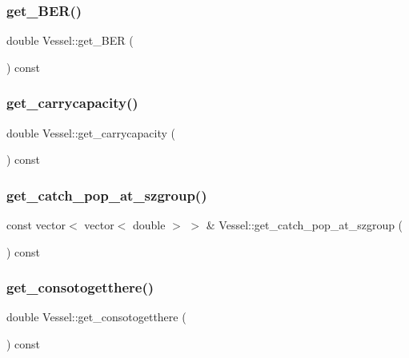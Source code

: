 \mbox{\label{class_vessel_ac8ae65328d4b7f44cf4db93d038dece6}} 
\subsubsection{\texorpdfstring{get\_BER()}{get\_BER()}}
{\footnotesize\ttfamily double Vessel\+::get\+\_\+\+B\+ER (\begin{DoxyParamCaption}{ }\end{DoxyParamCaption}) const}

\mbox{\label{class_vessel_ad842186a93c004b2d31434ff25f82e41}} 
\subsubsection{\texorpdfstring{get\_carrycapacity()}{get\_carrycapacity()}}
{\footnotesize\ttfamily double Vessel\+::get\+\_\+carrycapacity (\begin{DoxyParamCaption}{ }\end{DoxyParamCaption}) const}

\mbox{\label{class_vessel_a98fd681fbbe88e187bb3fea156651308}} 
\subsubsection{\texorpdfstring{get\_catch\_pop\_at\_szgroup()}{get\_catch\_pop\_at\_szgroup()}}
{\footnotesize\ttfamily const vector$<$ vector$<$ double $>$ $>$ \& Vessel\+::get\+\_\+catch\+\_\+pop\+\_\+at\+\_\+szgroup (\begin{DoxyParamCaption}{ }\end{DoxyParamCaption}) const}

\mbox{\label{class_vessel_a499e354d86723b1f055a7357484d3359}} 
\subsubsection{\texorpdfstring{get\_consotogetthere()}{get\_consotogetthere()}}
{\footnotesize\ttfamily double Vessel\+::get\+\_\+consotogetthere (\begin{DoxyParamCaption}{ }\end{DoxyParamCaption}) const}


